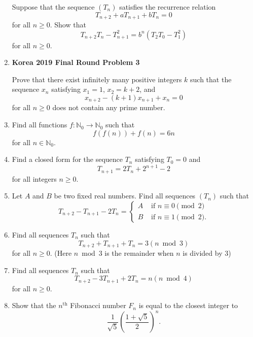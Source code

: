 \documentclass{article}
\begin{document}
\begin{enumerate}
Suppose that the sequence $(T_n)$ satisfies the recurrence relation
\[
    T_{n + 2} + aT_{n + 1} + bT_n = 0
\]
for all $n \geq 0$. Show that
\[
    T_{n + 2} T_n - T_{n + 1}^2 = b^n \left( T_2 T_0 - T_1^2 \right)
\]
for all $n \geq 0$.

\item {\textbf{Korea 2019 Final Round Problem 3}}

Prove that there exist infinitely many positive integers $k$ such that the sequence ${x_n}$ satisfying $x_1 = 1$, $x_2 = k + 2$, and
\[
    x_{n + 2} - (k + 1) x_{n + 1} + x_n = 0 
\]
for all $n \geq 0$ does not contain any prime number.

\item

Find all functions $f : \mathbb{N}_0 \to \mathbb{N}_0$ such that
\[
    f(f(n)) + f(n) = 6n
\]
for all $n \in \mathbb{N}_0$.

\item

Find a closed form for the sequence $T_n$ satisfying $T_0 = 0$ and
\[
    T_{n + 1} = 2T_n + 2^{n + 1} - 2
\]
for all integers $n \geq 0$.

\item

Let $A$ and $B$ be two fixed real numbers. Find all sequences $(T_n)$ such that
\[
    T_{n + 2} - T_{n + 1} - 2T_n = \begin{cases}
        A & \text{ if } n \equiv 0 \pmod 2 \\
        B & \text{ if } n \equiv 1 \pmod 2.
    \end{cases}
\]

\item

Find all sequences $T_n$ such that
\[
    T_{n + 2} + T_{n + 1} + T_n = 3 \left( n \bmod 3 \right)
\]
for all $n \geq 0$. (Here $n \bmod 3$ is the remainder when $n$ is divided by $3$)

\item

Find all sequences $T_n$ such that
\[
    T_{n + 2} - 3T_{n + 1} + 2T_n = n \left( n \bmod 4 \right)
\]
for all $n \geq 0$.

\item

Show that the $n^{\text{th}}$ Fibonacci number $F_n$ is equal to the closest integer to
\[
    \frac{1}{\sqrt{5}} \left( \frac{1 + \sqrt{5}}{2} \right)^n.
\]

\end{enumerate}
\end{document}
